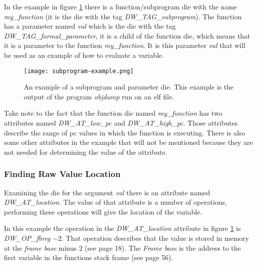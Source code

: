 In the example in figure \ref{fig:subprogramexample} there is a function/subprogram \gls{die} with the name \emph{my\_function} (it is the \gls{die} with the tag \emph{DW\_TAG\_subprogram}).
The function has a parameter named \emph{val} which is the \gls{die} with the tag \emph{DW\_TAG\_formal\_parameter}, it is a child of the function \gls{die}, which means that it is a parameter to the function \emph{my\_function}.
It is this parameter \emph{val} that will be used as an example of how to evaluate a variable.


\begin{figure}[h]
	\centering
	\texttt{[image: subprogram-example.png]}
	\caption{An example of a subprogram and parameter \gls{die}. This example is the output of the program \emph{objdump} run on an \gls{elf} file.}
	\label{fig:subprogramexample}
\end{figure}


Take note to the fact that the function \gls{die} named \emph{my\_function} has two attributes named \emph{DW\_AT\_low\_pc} and \emph{DW\_AT\_high\_pc}.
Those attributes describe the range of \gls{pc} values in which the function is executing.
There is also some other attributes in the example that will not be mentioned because they are not needed for determining the value of the attribute.




\subsubsection{Finding Raw Value Location}
Examining the \gls{die} for the argument \emph{val} there is an attribute named \emph{DW\_AT\_location}.
The value of that attribute is a number of operations, performing these operations will give the location of the variable.


In this example the operation in the \emph{DW\_AT\_location} attribute in figure \ref{fig:subprogramexample} is \emph{DW\_OP\_fbreg $-2$}.
That operation describes that the value is stored in memory at the \emph{frame base} minus $2$ (see \cite{dwarf} page 18).
The \emph{Frame base} is the address to the first variable in the functions stack frame (see \cite{dwarf} page 56).


